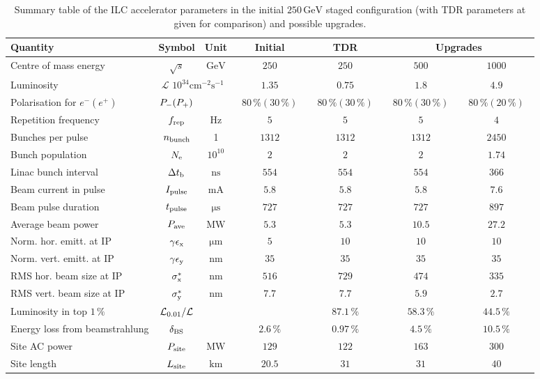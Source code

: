 \begin{table}
\begin{tabular}{lcccccc}
Quantity & Symbol & Unit & Initial & TDR &  \multicolumn{2}{c}{Upgrades} \\
\hline
Centre of mass energy & $\sqrt{s}$ & ${\mathrm{GeV}}$ & $250$ & $250$ & $500$ & $1000$ \\
Luminosity & \multicolumn{2}{c}{${\mathcal{L}}$ $10^{34}{\mathrm{cm^{-2}s^{-1}}}$} & $1.35$ & $0.75$ & $1.8$ & $4.9$ \\
Polarisation for $e^- (e^+)$ & $P_{\mathrm{-}} (P_{\mathrm{+}})$ & & ~$80\,\% (30\,\%)$~ &  ~$80\,\% (30\,\%)$~ &  ~$80\,\% (30\,\%)$~ &  ~$80\,\% (20\,\%)$~  \\
Repetition frequency &$f_{\mathrm{{rep}}}$ & ${\mathrm{Hz}}$  & $5$ & $5$ & $5$ & $4$ \\
Bunches per pulse  &$n_{\mathrm{{bunch}}}$ & 1  & $1312$ & $1312$ & $1312$ & $2450$ \\
Bunch population  &$N_{\mathrm{{e}}}$ & $10^{10}$ &$2$ & $2$ & $2$ & $1.74$ \\
Linac bunch interval & $\Delta t_{\mathrm{{b}}}$ & ${\mathrm{ns}}$ & $554$ & $554$ & $554$ & $366$ \\
Beam current in pulse & $I_{\mathrm{{pulse}}}$ & ${\mathrm{mA}}$& $5.8$ & $5.8$ & $5.8$ & $7.6$  \\
Beam pulse duration  & $t_{\mathrm{{pulse}}}$ & ${\mathrm{\mu s}}$ & $727$ & $727$ & $727$ & $897$ \\
Average beam power  & $P_{\mathrm{{ave}}}$   & ${\mathrm{MW}}$ & $5.3$ & $5.3$ & $10.5$  & $27.2$ \\  
Norm. hor. emitt. at IP & $\gamma\epsilon_{\mathrm{{x}}}$ & ${\mathrm{\mu m}}$& $5$ & $10$ & $10$ & $10$  \\ 
Norm. vert. emitt. at IP & $\gamma\epsilon_{\mathrm{{y}}}$ & ${\mathrm{nm}}$ & $35$ & $35$ & $35$ & $35$ \\ 
RMS hor. beam size at IP  & $\sigma^*_{\mathrm{{x}}}$ & ${\mathrm{nm}}$  & $516$ & $729$ & $474$ & $335$ \\
RMS vert. beam size at IP &$\sigma^*_{\mathrm{{y}}}$ & ${\mathrm{nm}}$ & $7.7$  & $7.7$  & $5.9$ & $2.7$ \\
Luminosity in top $1\,\%$ & ${\mathcal{L}}_{\mathrm{0.01}} / {\mathcal{L}}$ &  &   & $87.1\,\%$  & $58.3\,\%$ & $44.5\,\%$\\
Energy loss from beamstrahlung  & $\delta_{\mathrm{BS}}$ &  & $2.6\,\%$  & $0.97\,\%$  & $4.5\,\%$ & $10.5\,\%$ \\
Site AC power  & $P_{\mathrm{{site}}}$ &  ${\mathrm{MW}}$ & $129$ & $122$ & $163$ & $300$ \\
Site length & $L_{\mathrm{{site}}}$ &  ${\mathrm{km}}$ & $20.5$ & $31$ & $31$ & $40$ \\
\end{tabular}
\caption{Summary table of the ILC accelerator parameters in the initial $250\,{\mathrm{GeV}}$ staged configuration (with TDR parameters at  given for comparison) and possible upgrades.
\label{tab:ilc-params}}
\end{table}

